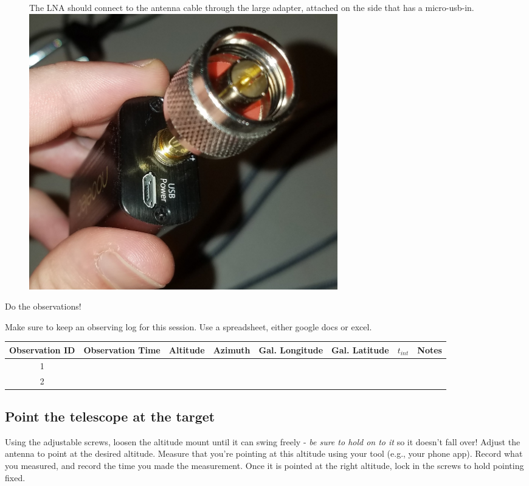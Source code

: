 \documentclass[11pt]{article}
\begin{document}
\begin{figure}[htp]
    \begin{minipage}{0.45\textwidth}
    \centering
        The LNA should connect to the antenna cable through the large adapter, attached on the side that has a micro-usb-in.\\
        \vspace{3mm}
    \includegraphics[width=0.65\textwidth]{RadioLabPhotos/coax_adapter_on_LNA.jpg}
    \end{minipage}
\end{figure}


\par Do the observations!

Make sure to keep an observing log for this session.  Use a spreadsheet, either google docs or excel.

\begin{tabular}{|c|c|c|c|c|c|c|c|}
\hline
Observation ID & Observation Time & Altitude & Azimuth &  Gal. Longitude & Gal. Latitude  & $t_{int}$ & Notes \\
\hline
 1  & & & & & & & \\
 \hline
 2  & & & & & & & \\
 \hline
\end{tabular}

\subsection{Point the telescope at the target}
\label{sec:point}
Using the adjustable screws, loosen the altitude mount until it can swing freely - \emph{be sure to hold on to it} so it doesn't fall over!
Adjust the antenna to point at the desired altitude.
Measure that you're pointing at this altitude using your tool (e.g., your phone app).
Record what you measured, and record the time you made the measurement.
Once it is pointed at the right altitude, lock in the screws to hold pointing fixed.
\end{document}
